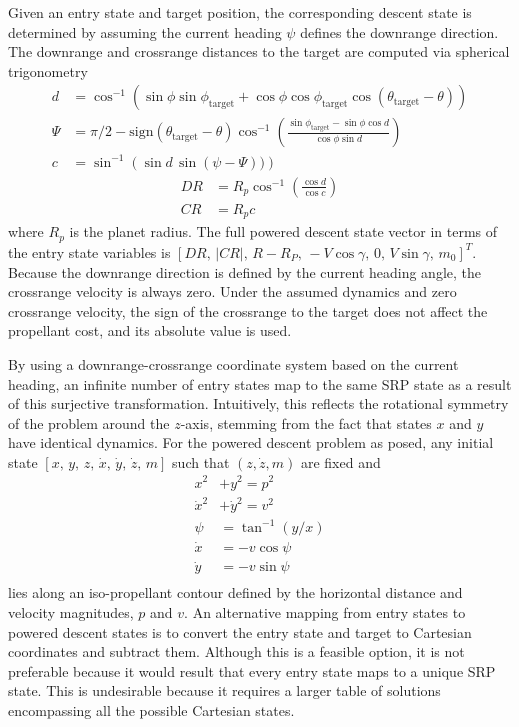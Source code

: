 \documentclass[letterpaper, paper,11pt]{AAS}
\begin{document}
Given an entry state and target position, the corresponding descent state is determined by assuming the current heading $\psi$ defines the downrange direction. The downrange and crossrange distances to the target are computed via spherical trigonometry \cite{joel_dissertation}
\begin{align}
d &= \cos^{-1}\left(\sin\phi\sin\phi_{\mathrm{target}} +\cos\phi\cos\phi_{\mathrm{target}}\cos(\theta_{\mathrm{target}}-\theta)        \right) \\
\Psi &= \pi/2 - \mathrm{sign}(\theta_{\mathrm{target}}-\theta) \cos^{-1}\left(\frac{\sin\phi_{\mathrm{target}}-\sin\phi\cos d}{\cos\phi\sin d}  \right) \\
c &= \sin^{-1}\left(\sin d\,\sin(\psi-\Psi))\right)
\end{align}
\begin{align}
DR &= R_p\cos^{-1}\left(\frac{\cos d}{\cos c}\right)\\
CR &= R_pc
\end{align}
where $R_p$ is the planet radius. 
The full powered descent state vector in terms of the entry state variables is $[DR,\, |CR|,\, R-R_P,\, -V\cos\gamma,\, 0,\, V\sin\gamma,\, m_0]^T$. Because the downrange direction is defined by the current heading angle, the crossrange velocity is always zero. Under the assumed dynamics and zero crossrange velocity, the sign of the crossrange to the target does not affect the propellant cost, and its absolute value is used.

By using a downrange-crossrange coordinate system based on the current heading, an infinite number of entry states map to the same SRP state as a result of this surjective transformation. Intuitively, this reflects the rotational symmetry of the problem around the $z$-axis, stemming from the fact that states $ x $ and $ y $ have identical dynamics. For the powered descent problem as posed, any initial state $[ x,\, y,\, z,\, \dot{x},\, \dot{y},\, \dot{z},\, m]$ such that $(z, \dot{z}, m)$ are fixed and 
\begin{align}
x^2 &+ y^2 = p^2 \\
\dot{x}^2 &+ \dot{y}^2 = v^2 \\
\psi &= \tan^{-1}(y/x) \\
\dot{x} &= -v\cos\psi \\
\dot{y} &= -v\sin\psi \\
\end{align}
lies along an iso-propellant contour defined by the horizontal distance and velocity magnitudes, $p$ and $v$. An alternative mapping from entry states to powered descent states is to convert the entry state and target to Cartesian coordinates and subtract them. Although this is a feasible option, it is not preferable because it would result that every entry state maps to a unique SRP state. This is undesirable because it requires a larger table of solutions encompassing all the possible Cartesian states.
\end{document}
